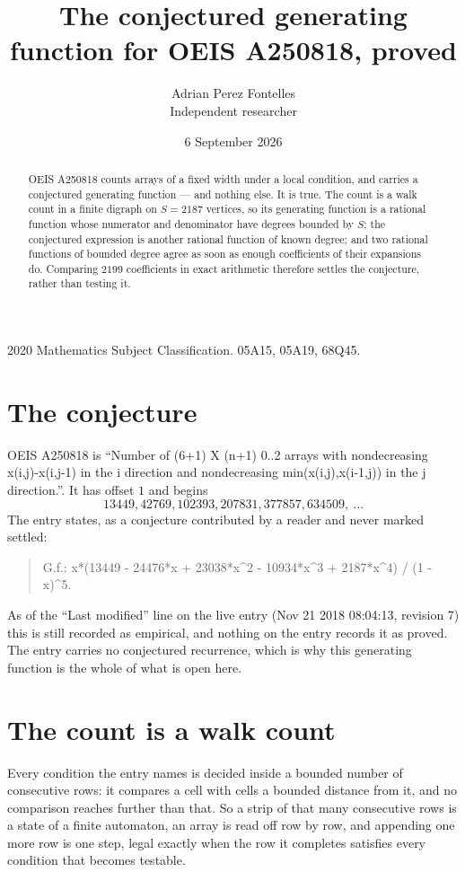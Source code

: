 \documentclass[11pt,a4paper]{article}
\title{The conjectured generating function for OEIS A250818, proved}
\author{Adrian Perez Fontelles\\ \small Independent researcher}
\date{6 September 2026}
\theoremstyle{plain}
\theoremstyle{definition}
\begin{document}
\maketitle

\begin{abstract}
OEIS A250818 counts arrays of a fixed width under a local condition, and carries a conjectured
generating function --- and nothing else. It is true. The count is a walk count in a finite
digraph on $S=2187$ vertices, so its generating function is a rational function whose numerator
and denominator have degrees bounded by $S$; the conjectured expression is another rational
function of known degree; and two rational functions of bounded degree agree as soon as enough
coefficients of their expansions do. Comparing $2199$ coefficients in exact arithmetic
therefore settles the conjecture, rather than testing it.
\end{abstract}

\noindent\small 2020 Mathematics Subject Classification. 05A15, 05A19, 68Q45.\normalsize

\section{The conjecture}

OEIS A250818 is ``Number of (6+1) X (n+1) 0..2 arrays with nondecreasing x(i,j)-x(i,j-1) in the i direction and nondecreasing min(x(i,j),x(i-1,j)) in the j direction.''. It has offset $1$ and begins
\[
13449, 42769, 102393, 207831, 377857, 634509,\ \dots
\]
The entry states, as a conjecture contributed by a reader and never marked settled:
\begin{quote}
G.f.: x*(13449 - 24476*x + 23038*x\^{}2 - 10934*x\^{}3 + 2187*x\^{}4) / (1 - x)\^{}5.
\end{quote}
As of the ``Last modified'' line on the live entry (Nov 21 2018 08:04:13, revision 7) this is still
recorded as empirical, and nothing on the entry records it as proved. The entry carries no
conjectured recurrence, which is why this generating function is the whole of what is open
here.

\section{The count is a walk count}

Every condition the entry names is decided inside a bounded number of consecutive rows: it
compares a cell with cells a bounded distance from it, and no comparison reaches further than
that. So a strip of that many consecutive rows is a state of a finite automaton, an array is
read off row by row, and appending one more row is one step, legal exactly when the row it
completes satisfies every condition that becomes testable.
\end{document}
